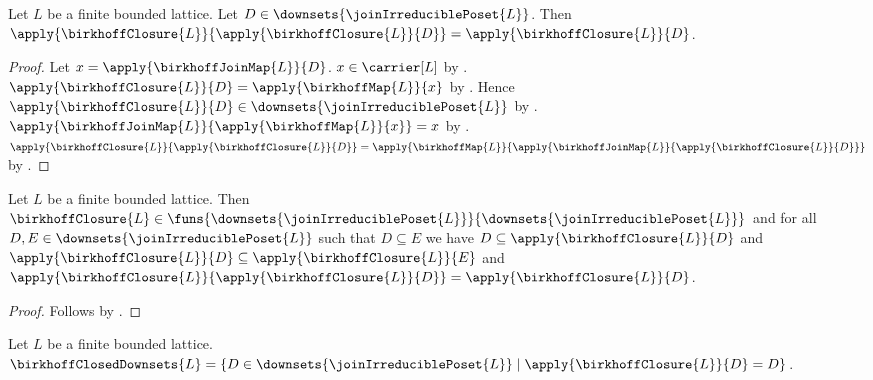 \begin{proposition}\label{birkhoff_closure_idempotent}
    Let $L$ be a finite bounded lattice.
    Let $D\in\downsets{\joinIrreduciblePoset{L}}$.
    Then $\apply{\birkhoffClosure{L}}{\apply{\birkhoffClosure{L}}{D}}
        =\apply{\birkhoffClosure{L}}{D}$.
\end{proposition}
\begin{proof}
    Let $x=\apply{\birkhoffJoinMap{L}}{D}$.
    $x\in\carrier[L]$ by
        .
    $\apply{\birkhoffClosure{L}}{D}=\apply{\birkhoffMap{L}}{x}$ by
        .
    Hence $\apply{\birkhoffClosure{L}}{D}
        \in\downsets{\joinIrreduciblePoset{L}}$ by
        .
    $\apply{\birkhoffJoinMap{L}}{\apply{\birkhoffMap{L}}{x}}=x$ by
        .
    $\apply{\birkhoffClosure{L}}{\apply{\birkhoffClosure{L}}{D}}
        =\apply{\birkhoffMap{L}}
            {\apply{\birkhoffJoinMap{L}}
                {\apply{\birkhoffClosure{L}}{D}}}$ by
        .
\end{proof}

\begin{theorem}\label{finite_birkhoff_closure_laws}
    Let $L$ be a finite bounded lattice.
    Then $\birkhoffClosure{L}\in
        \funs{\downsets{\joinIrreduciblePoset{L}}}
            {\downsets{\joinIrreduciblePoset{L}}}$ and
        for all $D,E\in\downsets{\joinIrreduciblePoset{L}}$ such that
            $D\subseteq E$ we have
            $D\subseteq\apply{\birkhoffClosure{L}}{D}$ and
            $\apply{\birkhoffClosure{L}}{D}
                \subseteq\apply{\birkhoffClosure{L}}{E}$ and
            $\apply{\birkhoffClosure{L}}
                {\apply{\birkhoffClosure{L}}{D}}
                =\apply{\birkhoffClosure{L}}{D}$.
\end{theorem}
\begin{proof}
    Follows by
        .
\end{proof}

\begin{definition}\label{birkhoff_closed_downsets}
    Let $L$ be a finite bounded lattice.
    $\birkhoffClosedDownsets{L}
        =\{D\in\downsets{\joinIrreduciblePoset{L}}\mid
            \apply{\birkhoffClosure{L}}{D}=D\}$.
\end{definition}

